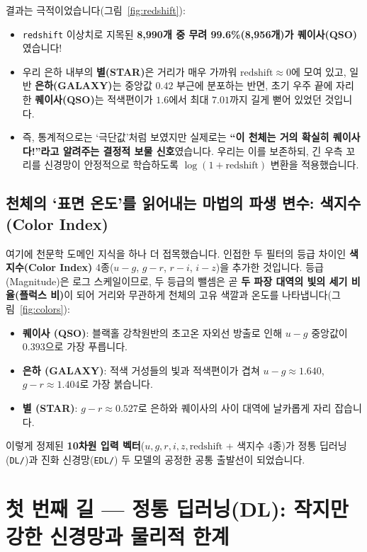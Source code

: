 \documentclass[11pt,a4paper]{article}
\begin{document}
결과는 극적이었습니다(그림~\ref{fig:redshift}):
\begin{itemize}[leftmargin=16pt, itemsep=2pt]
  \item \texttt{redshift} 이상치로 지목된 \textbf{8,990개 중 무려 99.6\%(8,956개)가 퀘이사(QSO)}였습니다!
  \item 우리 은하 내부의 \textbf{별(STAR)}은 거리가 매우 가까워 $\text{redshift} \approx 0$에 모여 있고, 일반 \textbf{은하(GALAXY)}는 중앙값 $0.42$ 부근에 분포하는 반면, 초기 우주 끝에 자리한 \textbf{퀘이사(QSO)}는 적색편이가 $1.6$에서 최대 $7.01$까지 길게 뻗어 있었던 것입니다.
  \item 즉, 통계적으로는 `극단값'처럼 보였지만 실제로는 \textbf{``이 천체는 거의 확실히 퀘이사다!''라고 알려주는 결정적 보물 신호}였습니다. 우리는 이를 보존하되, 긴 우측 꼬리를 신경망이 안정적으로 학습하도록 $\log(1 + \text{redshift})$ 변환을 적용했습니다.
\end{itemize}

\subsection{천체의 `표면 온도'를 읽어내는 마법의 파생 변수: 색지수 (Color Index)}

여기에 천문학 도메인 지식을 하나 더 접목했습니다. 인접한 두 필터의 등급 차이인 \textbf{색지수(Color Index)} 4종($u-g$, $g-r$, $r-i$, $i-z$)을 추가한 것입니다. 등급(Magnitude)은 로그 스케일이므로, 두 등급의 뺄셈은 곧 \textbf{두 파장 대역의 빛의 세기 비율(플럭스 비)}이 되어 거리와 무관하게 천체의 고유 색깔과 온도를 나타냅니다(그림~\ref{fig:colors}):
\begin{itemize}[leftmargin=16pt, itemsep=2pt]
  \item \textbf{퀘이사 (QSO)}: 블랙홀 강착원반의 초고온 자외선 방출로 인해 $u-g$ 중앙값이 $0.393$으로 가장 푸릅니다.
  \item \textbf{은하 (GALAXY)}: 적색 거성들의 빛과 적색편이가 겹쳐 $u-g \approx 1.640$, $g-r \approx 1.404$로 가장 붉습니다.
  \item \textbf{별 (STAR)}: $g-r \approx 0.527$로 은하와 퀘이사의 사이 대역에 날카롭게 자리 잡습니다.
\end{itemize}

이렇게 정제된 \textbf{10차원 입력 벡터}($u, g, r, i, z, \text{redshift}$ + 색지수 4종)가 정통 딥러닝(\texttt{DL/})과 진화 신경망(\texttt{EDL/}) 두 모델의 공정한 공통 출발선이 되었습니다.

\section{첫 번째 길 --- 정통 딥러닝(DL): 작지만 강한 신경망과 물리적 한계}
\end{document}
